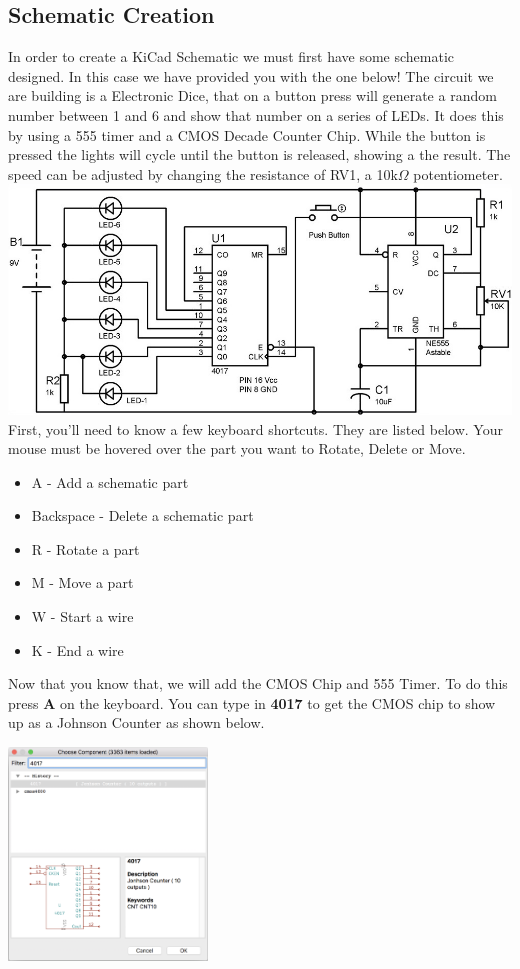 \subsection{Schematic Creation}
In order to create a KiCad Schematic we must first have some schematic designed. In this case we have provided you with the one below! The circuit we are building is a Electronic Dice, that on a button press will generate a random number between 1 and 6 and show that number on a series of LEDs. It does this by using a 555 timer and a CMOS Decade Counter Chip. While the button is pressed the lights will cycle until the button is released, showing a the result. The speed can be adjusted by changing the resistance of RV1, a 10k$\Omega$ potentiometer.
\includegraphics[width=\textwidth]{sch.jpeg}
First, you'll need to know a few keyboard shortcuts. They are listed below. Your mouse must be hovered over the part you want to Rotate, Delete or Move.
\begin{itemize}
	\item A - Add a schematic part
	\item Backspace - Delete a schematic part
	\item R - Rotate a part
	\item M - Move a part
	\item W - Start a wire
	\item K - End a wire
\end{itemize}
\newpage
Now that you know that, we will add the CMOS Chip and 555 Timer. To do this press \textbf{A} on the keyboard. You can type in \textbf{4017} to get the CMOS chip to show up as a Johnson Counter as shown below.
\begin{center}
	\includegraphics[width=200px]{4017}
\end{center}
